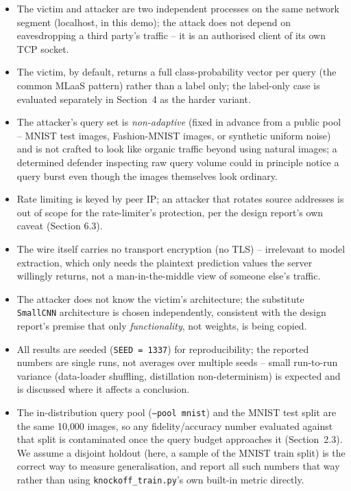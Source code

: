 \documentclass[11pt]{article}
\begin{document}
\begin{itemize}
\item The victim and attacker are two independent processes on the same
  network segment (localhost, in this demo); the attack does not depend on
  eavesdropping a third party's traffic -- it is an authorised client of its
  own TCP socket.
\item The victim, by default, returns a full class-probability vector per
  query (the common MLaaS pattern) rather than a label only; the label-only
  case is evaluated separately in Section~4 as the harder variant.
\item The attacker's query set is \emph{non-adaptive} (fixed in advance from a
  public pool -- MNIST test images, Fashion-MNIST images, or synthetic
  uniform noise) and is not crafted to look like organic traffic beyond
  using natural images; a determined defender inspecting raw query volume
  could in principle notice a query burst even though the images themselves
  look ordinary.
\item Rate limiting is keyed by peer IP; an attacker that rotates source
  addresses is out of scope for the rate-limiter's protection, per the
  design report's own caveat (Section 6.3).
\item The wire itself carries no transport encryption (no TLS) -- irrelevant
  to model extraction, which only needs the plaintext prediction values the
  server willingly returns, not a man-in-the-middle view of someone else's
  traffic.
\item The attacker does not know the victim's architecture; the substitute
  \texttt{SmallCNN} architecture is chosen independently, consistent with the
  design report's premise that only \emph{functionality}, not weights, is
  being copied.
\item All results are seeded (\texttt{SEED = 1337}) for reproducibility; the
  reported numbers are single runs, not averages over multiple seeds --
  small run-to-run variance (data-loader shuffling, distillation
  non-determinism) is expected and is discussed where it affects a
  conclusion.
\item The in-distribution query pool (\texttt{--pool mnist}) and the
  MNIST test split are the same 10{,}000 images, so any fidelity/accuracy
  number evaluated against that split is contaminated once the query budget
  approaches it (Section~2.3). We assume a disjoint holdout (here, a sample
  of the MNIST train split) is the correct way to measure generalisation,
  and report all such numbers that way rather than using
  \texttt{knockoff\_train.py}'s own built-in metric directly.
\end{itemize}
\end{document}
